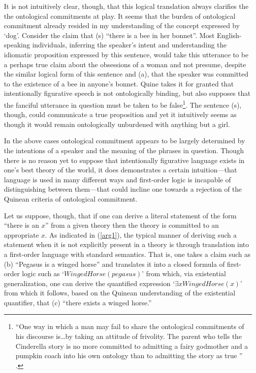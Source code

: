 \documentclass[12pt,a4paper]{article}
\begin{document}
It is not intuitively clear, though, that this logical translation
always clarifies the the ontological commitments at play.
It seems that the burden of ontological commitment already resided in my
understanding of the concept expressed by `dog'.  Consider the claim
that (s) ``there is a bee in her bonnet''. Most English-speaking
individuals, inferring the speaker's intent and understanding the
idiomatic proposition expressed by this sentence, would take this
utterance to be a perhaps true claim about the obsessions of a woman
and not presume, despite the similar logical form of this sentence and
(a), that the speaker was committed to the existence of a bee in
anyone's bonnet.  Quine takes it for granted that intentionally
figurative speech is not ontologically binding, but also supposes that
the fanciful utterance in question must be taken to be false\footnote{
  ``One way in which a man may fail to share the ontological
  commitments of his discourse is\ldots by taking an attitude of
  frivolity.  The parent who tells the Cinderella story is no more
  committed to admitting a fairy godmother and a pumpkin coach into
  his own ontology than to admitting the story as true ''
  \cite[p.103]{quine}.}. The sentence (s), though, could communicate a
true proposition and yet it intuitively seems as though it would
remain ontologically unburdened with anything but a girl.

In the above cases ontological commitment appears to be largely
determined by the intentions of a speaker and the meaning of the
phrases in question.  Though there is no reason yet to suppose that
intentionally figurative language exists in one's best theory of the
world, it does demonstrates a certain intuition---that language is used
in many different ways and first-order logic is incapable of
distinguishing between them---that could incline one towards a
rejection of the Quinean criteria of ontological commitment.

Let us suppose, though, that if one can derive a literal statement of
the form ``there is an $x$'' from a given theory then the theory is
committed to an appropriate $x$.  As indicated in (\ref{arg1}), the
typical manner of deriving such a statement when it is not explicitly
present in a theory is through translation into a first-order language
with standard semantics.  That is, one takes a claim such as (b)
``Pegasus is a winged horse'' and translates it into a closed formula
of first-order logic such as `$WingedHorse(pegasus)$' from which, via
existential generalization, one can derive the quantified expression
`$\exists xWingedHorse(x)$' from which it follows, based on the
Quinean understanding of the existential quantifier, that (c) ``there
exists a winged horse.''
\end{document}
